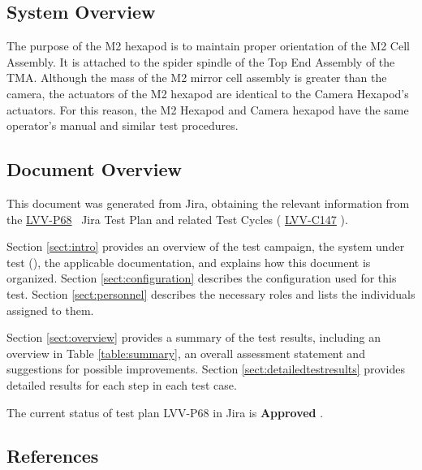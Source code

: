\documentclass[SE,lsstdraft,STR,toc]{lsstdoc}
\begin{document}
\subsection{System Overview}
\label{sect:systemoverview}

 The purpose of the M2 hexapod is to maintain proper orientation of the
M2 Cell Assembly. It is attached to the spider spindle of the Top End
Assembly of the TMA. Although the mass of the M2 mirror cell assembly is
greater than the camera, the actuators of the M2 hexapod are identical
to the Camera Hexapod's actuators. For this reason, the M2 Hexapod and
Camera hexapod have the same operator's manual and similar test
procedures.~


\subsection{Document Overview}
\label{sect:docoverview}

This document was generated from Jira, obtaining the relevant information from the 
\href{https://jira.lsstcorp.org/secure/Tests.jspa#/testPlan/LVV-P68}{LVV-P68}
~Jira Test Plan and related Test Cycles (
  \href{https://jira.lsstcorp.org/secure/Tests.jspa#/testCycle/LVV-C147}{LVV-C147}
).

Section \ref{sect:intro} provides an overview of the test campaign, the system under test (\product{}), the applicable documentation, and explains how this document is organized.
Section \ref{sect:configuration}  describes the configuration used for this test.
Section \ref{sect:personnel} describes the necessary roles and lists the individuals assigned to them.

Section \ref{sect:overview} provides a summary of the test results, including an overview in Table \ref{table:summary}, an overall assessment statement and suggestions for possible improvements.
Section \ref{sect:detailedtestresults} provides detailed results for each step in each test case.

The current status of test plan LVV-P68 in Jira is \textbf{ Approved }.

\subsection{References}
\label{sect:references}
\renewcommand{\refname}{}

\end{document}
